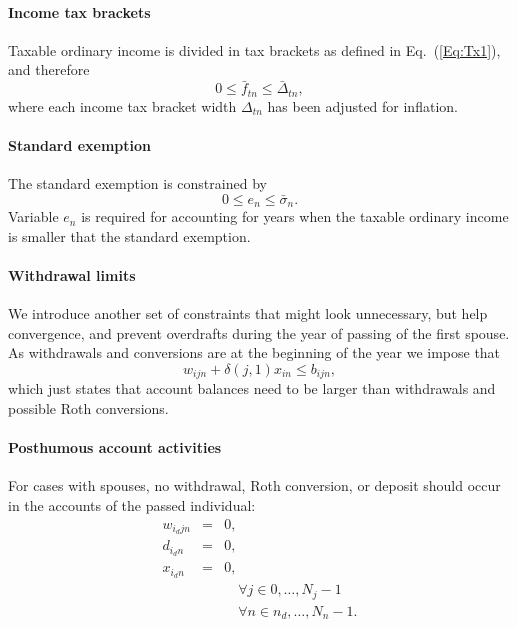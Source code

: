 \documentclass{report}[fleqn,12pt]
\begin{document}
\paragraph*{Income tax brackets}
	Taxable ordinary income is divided in tax brackets as defined in Eq.~(\ref{Eq:Tx1}),
	and therefore
	\begin{equation}
		\label{Eq:C2}
		0 \le \bar{f}_{tn} \le \bar{\Delta}_{tn},
	\end{equation}
	where each income tax bracket width $\Delta_{tn}$ has been adjusted for inflation.

\paragraph*{Standard exemption}
	The standard exemption is constrained by
	\begin{equation}
		0 \le e_n \le \bar{\sigma}_n.
	\end{equation}
	Variable $e_n$ is required for accounting for years when the taxable ordinary
	income is smaller that the standard exemption.

\paragraph*{Withdrawal limits}
	We introduce another set of constraints that might look unnecessary, but help
	convergence, and prevent overdrafts during the year of passing of the first spouse.
	As withdrawals and conversions are at the beginning of the year 
	we impose that
	\begin{equation}
		w_{ijn} + \delta(j, 1)x_{in} \le b_{ijn},
	\end{equation}
	which just states that account balances need to be larger than withdrawals and possible Roth conversions.

\paragraph*{Posthumous account activities}
	For cases with spouses, no withdrawal, Roth conversion, or deposit should
	occur in the accounts of the passed individual:
	\begin{eqnarray}
		w_{i_djn} &=& 0,\nonumber\\
		d_{i_dn} &=& 0, \nonumber \\
		x_{i_dn} &=& 0, \nonumber \\
		&& \quad \forall j \in {0, \ldots, N_j-1} \nonumber \\
		&& \quad \forall n \in {n_d, \ldots, N_n-1}.
	\end{eqnarray}
\end{document}
